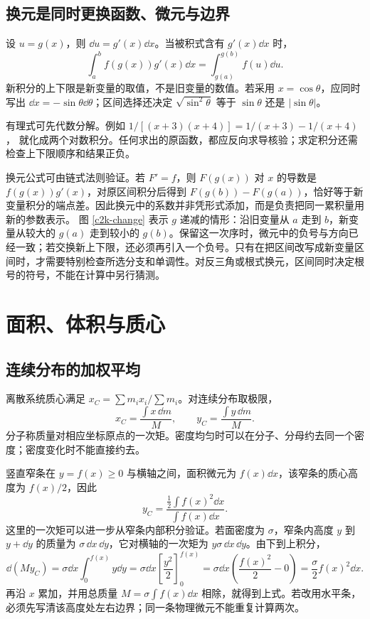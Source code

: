 \subsection{换元是同时更换函数、微元与边界}
设 $u=g(x)$，则 $\dd u=g'(x)\dd x$。当被积式含有 $g'(x)\dd x$ 时，
\[
 \int_a^b f(g(x))g'(x)\dd x
 =\int_{g(a)}^{g(b)}f(u)\dd u.
\]
新积分的上下限是新变量的取值，不是旧变量的数值。若采用 $x=\cos\theta$，应同时写出 $\dd x=-\sin\theta\dd\theta$；区间选择还决定 $\sqrt{\sin^2\theta}$ 等于 $\sin\theta$ 还是 $|\sin\theta|$。

有理式可先代数分解。例如
$1/[(x+3)(x+4)]=1/(x+3)-1/(x+4)$，
就化成两个对数积分。任何求出的原函数，都应反向求导核验；求定积分还需检查上下限顺序和结果正负。

换元公式可由链式法则验证。若 $F'=f$，则 $F(g(x))$ 对 $x$ 的导数是 $f(g(x))g'(x)$，对原区间积分后得到 $F(g(b))-F(g(a))$，恰好等于新变量积分的端点差。因此换元中的系数并非凭形式添加，而是负责把同一累积量用新的参数表示。
图 \ref{c2k-change} 表示 $g$ 递减的情形：沿旧变量从 $a$ 走到 $b$，新变量从较大的 $g(a)$ 走到较小的 $g(b)$。保留这一次序时，微元中的负号与方向已经一致；若交换新上下限，还必须再引入一个负号。只有在把区间改写成新变量区间时，才需要特别检查所选分支和单调性。对反三角或根式换元，区间同时决定根号的符号，不能在计算中另行猜测。

\section{面积、体积与质心}
\subsection{连续分布的加权平均}
离散系统质心满足 $x_C=\sum m_ix_i/\sum m_i$。对连续分布取极限，
\[
 x_C=\frac{\int x\,\dd m}{M},\qquad
 y_C=\frac{\int y\,\dd m}{M}.
\]
分子称质量对相应坐标原点的一次矩。密度均匀时可以在分子、分母约去同一个密度；密度变化时不能直接约去。

竖直窄条在 $y=f(x)\ge0$ 与横轴之间，面积微元为 $f(x)\dd x$，该窄条的质心高度为 $f(x)/2$，因此
\[
 y_C=\frac{\tfrac12\int f(x)^2\dd x}{\int f(x)\dd x}.
\]
这里的一次矩可以进一步从窄条内部积分验证。若面密度为 $\sigma$，窄条内高度 $y$ 到 $y+\dd y$ 的质量为 $\sigma\,\dd x\,\dd y$，它对横轴的一次矩为 $y\sigma\,\dd x\,\dd y$。由下到上积分，
\[
 \dd(M y_C)=\sigma\dd x\int_0^{f(x)}y\dd y
 =\sigma\dd x\left[\frac{y^2}{2}\right]_0^{f(x)}
 =\sigma\dd x\left(\frac{f(x)^2}{2}-0\right)
 =\frac{\sigma}{2}f(x)^2\dd x.
\]
再沿 $x$ 累加，并用总质量 $M=\sigma\int f(x)\dd x$ 相除，就得到上式。若改用水平条，必须先写清该高度处左右边界；同一条物理微元不能重复计算两次。

